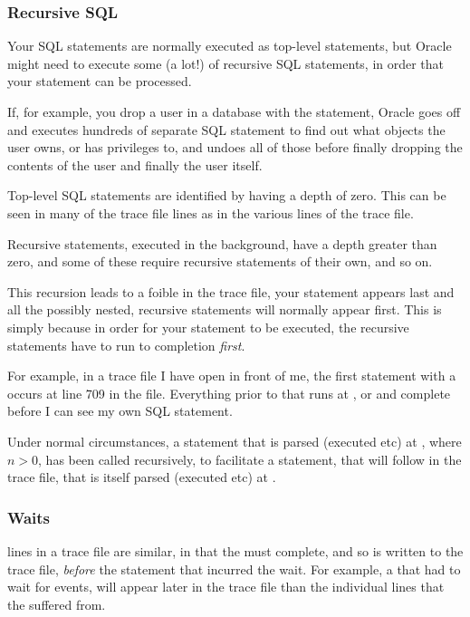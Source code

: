 \subsubsection{Recursive SQL}\label{recursive-sql}

Your SQL statements are normally executed as top-level statements, but Oracle might need to execute some (a lot!) of recursive SQL statements, in order that your statement can be processed. 

If, for example, you drop a user in a database with the  statement, Oracle goes off and executes hundreds of separate SQL statement to find out what objects the user owns, or has privileges to, and undoes all of those before finally dropping the contents of the user and finally the user itself.

Top-level SQL statements are identified by having a depth of zero. This can be seen in many of the trace file lines as  in the various lines of the trace file.

Recursive statements, executed in the background, have a depth greater than zero, and some of these require recursive statements of their own, and so on.

This recursion leads to a foible in the trace file, your statement appears last and all the possibly nested, recursive statements will normally appear first. This is simply because in order for your statement to be executed, the recursive statements have to run to completion \emph{first}.

For example, in a trace file I have open in front of me, the first statement with a  occurs at line 709 in the file. Everything prior to that runs at ,  or  and complete before I can see my own SQL statement. 

Under normal circumstances, a statement that is parsed (executed etc) at , where $n > 0$, has been called recursively, to facilitate a statement, that will follow in the trace file, that is itself parsed (executed etc) at .

\subsubsection{Waits}\label{waits}

 lines in a trace file are similar, in that the  must complete, and so is written to the trace file, \emph{before} the statement that incurred the wait. For example, a  that had to wait for  events, will appear later in the trace file than the individual  lines that the  suffered from.

